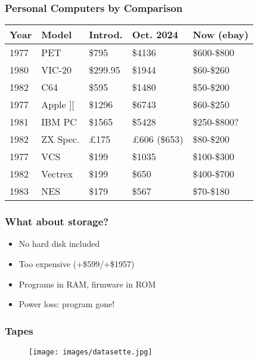 \documentclass{beamer}
\begin{document}
\begin{frame}
\frametitle{Personal Computers by Comparison}

\begin{tabular}{|l|l|l|l|l|}
\hline Year & Model & Introd. & Oct. 2024 & Now (ebay) \\ \hline
1977 & PET & \$795 & \$4136 & \$600-\$800 \\
1980 & VIC-20 & \$299.95 & \$1944 & \$60-\$260 \\
1982 & C64 & \$595 & \$1480 & \$50-\$200 \\ \hline
1977 & Apple ][ & \$1296 & \$6743 & \$60-\$250 \\
1981 & IBM PC & \$1565 & \$5428 & \$250-\$800? \\
1982 & ZX Spec. & \pounds 175 & \pounds 606 (\$653) & \$80-\$200 \\ \hline
1977 & VCS & \$199 & \$1035 & \$100-\$300 \\
1982 & Vectrex & \$199 & \$650 & \$400-\$700 \\
1983 & NES & \$179 & \$567 & \$70-\$180 \\ \hline
\end{tabular}

\end{frame}


\begin{frame}
\frametitle{What about storage?}

\begin{itemize}
    \item No hard disk included
    \item Too expensive (+\$599/+\$1957)
    \item Programs in RAM, firmware in ROM
    \item Power loss: program gone!
\end{itemize}

\end{frame}


\begin{frame}
\frametitle{Tapes}

\begin{figure}
\texttt{[image: images/datasette.jpg]}
\end{figure}

\end{frame}
\end{document}
